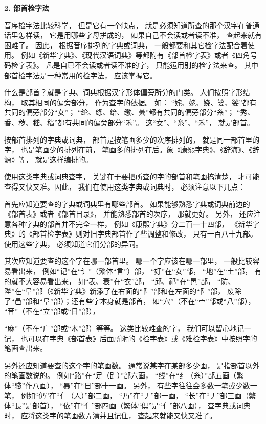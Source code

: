 \textbf{2. 部首检字法}

音序检字法比较科学，
但是它有一个缺点，
就是必须知道所查的那个汉字在普通话里怎样读，
它是用哪些字母拼成的，
如果自己不会读或者读不准，
查起来就有困难了。
因此，
根据音序排列的字典或词典，
一般都要和其它检字法配合着使用。
例如《新华字典》、《现代汉语词典》等都附有《部首检字表》或者《四角号码检字表》。
凡是自已不会读或者读不准的字，
只能运用别的检字法来查。
其中部首检字法是一种常用的检字法，
应该掌握它。

什么是部首？就是字典、词典根据汉字形体偏旁所分的门类。
人们按照字形结构，
取其相同的偏旁部分，
作为查字的依据。
如：
“姹、姥、娆、婆、娑”都有共同的偏旁部分“女”；
“纶、绦、绐、缴、纍”都有共同的偏旁部分“糸”；
“秀、香、秽、嵇、穑”都有共同的偏旁部分“禾”。
这“女”、“糸”、“禾”，
就是部首。

按部首排列的字典或词典，
部首是按笔画多少的次序排列的，
就是同一部首里的字，
也是笔画少的排列在前，
笔画多的排列在后。象《康熙字典》、《辞海》、《辞源》等，
就是这样编排的。

使用这类字典或词典查字，
关键在于要把所查的字的部首和笔画搞清楚，
才可能查得又快又准。因此，
我们在使用这类字典或词典时，
必须注意以下几点：

首先应知道要查的字典或词典里有哪些部首。
如果能够熟悉字典或词典前边的《部首表》或者《部首目录》，
并能熟悉部首的次序，
那就更好。
另外，
还应注意各种字典的部首并不完全一样，
例如《康熙字典》分二百一十四部，
《新华字典》的《部首检字表》则对旧字典部首作了些调整和修改，
只有一百八十九部。
使用这些字典，
必须知道它们分部的异同。

其次应知道要查的这个字在哪一部首里。
哪一个字应该在哪一部里，
一般比较容易看出来，
例如“记”在“讠”（繁体“言”）部，
“好”在“女”部，
“地”在“土”部，
有的就不大容易看出来，
如“表、衰”在“衣”部，
“邱、祁”在“邑”部，
“防、陛”在“阜”部（《新华字典》新添了在右面的“阝”部和在左面的“阝”部，
废除了“邑”部和“阜”部）；还有些字本身就是部首，
如“穴”（不在“宀”部或“八”部），
“音”（不在“立”部或“日”部），

\noindent
“麻”（不在“广”部或“木”部）等等。
这类比较难查的字，
我们可以留心地记一记，
也可以在字典《部首表》后面所附的《检字表》或《难检字表》中按照字的笔画查出来。

另外还应知道要查的这个字的笔画数。
通常说某字在某部多少画，
是指部首以外的笔画数说的。
例如“路”在“足（⻊）”部六画，
“线”在“纟（糸）”部五画（繁体“綫”作八画），
“暴”在“日”部十一画。
另外，
有些字往往会多数一笔或少数一笔，
例如“仍”在“亻（人）”部二画，
“乃”在“丿”部一画，
“长”在“丿”部三画（繁体“長”是部首），
“依”在“亻”部四画（繁体“倶”是“亻”部八画），
查字典或词典时，
应将这类字的笔画数弄清并且记住，
查起来就能又快又准了。

